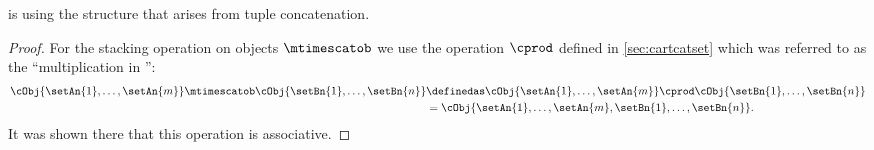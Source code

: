 {


\begin{lemma}
    \label{lem:SetL-is-associative-stacking}
    \SetL is   using the structure that arises from tuple concatenation.
\end{lemma}
\begin{proof}
    For the stacking operation on objects $\mtimescatob$ we use the operation $\cprod$ defined in \cref{sec:cartcatset} which was referred to as the ``multiplication in \SetL'':
    \begin{align}
        \cObj{\setAn{1}, \dots, \setAn{m}} \mtimescatob \cObj{\setBn{1}, \dots, \setBn{n}} & \definedas \cObj{\setAn{1}, \dots, \setAn{m}} \cprod \cObj{\setBn{1}, \dots, \setBn{n}} \\
                                                                                           & = \cObj{\setAn{1}, \dots, \setAn{m}, \setBn{1}, \dots, \setBn{n}}.
    \end{align}
    It was shown there that this operation is associative.


\end{proof}}
